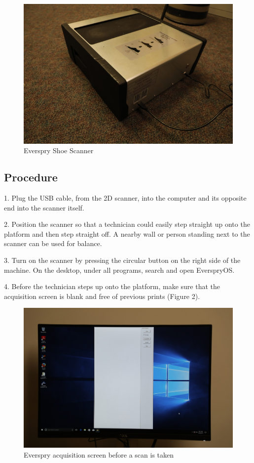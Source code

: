\begin{figure}[!htp]
\centering
\includegraphics[scale=0.3]{2D_Scanner}
\caption{Everspry Shoe Scanner}
\label{Image 1}
\end{figure}

\subsection{Procedure}

1.	Plug the USB cable, from the 2D scanner, into the computer and its opposite end into the scanner itself.

2.	Position the scanner so that a technician could easily step straight up onto the platform and then step straight off. A nearby wall or person standing next to the scanner can be used for balance. 

3.	Turn on the scanner by pressing the circular button on the right side of the machine. On the desktop, under all programs, search and open EverspryOS.

4.	Before the technician steps up onto the platform, make sure that the acquisition screen is blank and free of previous prints (Figure 2). 

\begin{figure}[!htp]
\centering
\includegraphics[scale=0.3]{2D_Screen}
\caption{Everspry acquisition screen before a scan is taken}
\label{Image 2}
\end{figure}

